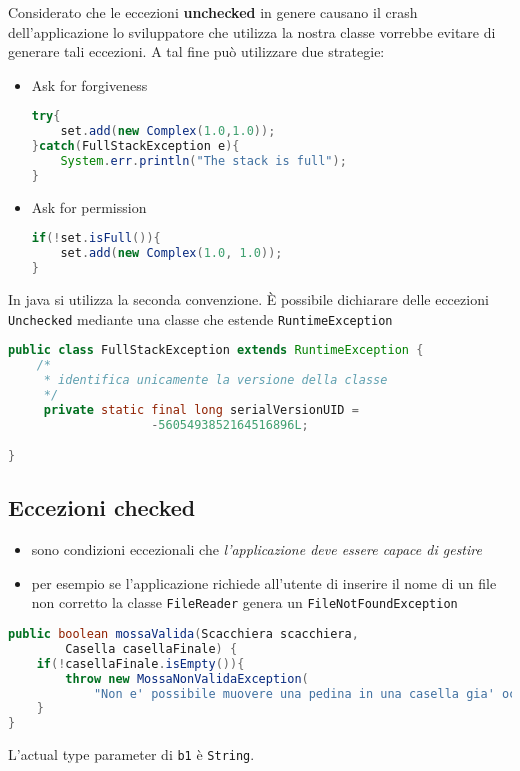 \documentclass{article}
\begin{document}
Considerato che le eccezioni \textbf{unchecked} in genere causano il crash dell'applicazione lo sviluppatore che utilizza la nostra classe vorrebbe evitare di generare tali eccezioni. A tal fine pu\`o utilizzare due strategie:
\begin{itemize}
\item Ask for forgiveness
\begin{lstlisting}[language=Java]
try{
    set.add(new Complex(1.0,1.0));
}catch(FullStackException e){
    System.err.println("The stack is full");
}
\end{lstlisting}
\item Ask for permission
\begin{lstlisting}[language=Java]
if(!set.isFull()){
    set.add(new Complex(1.0, 1.0));
}
\end{lstlisting}

\end{itemize}
 In java si utilizza la seconda convenzione.
\`E possibile dichiarare delle eccezioni \texttt{Unchecked} mediante una classe che estende \texttt{RuntimeException}

\begin{lstlisting}[language=Java]
public class FullStackException extends RuntimeException {
    /*
     * identifica unicamente la versione della classe 
     */
     private static final long serialVersionUID = 
	                -5605493852164516896L;

}
\end{lstlisting}



\subsection{Eccezioni checked}
\begin{itemize}
\item sono condizioni eccezionali che \emph{l'applicazione deve essere capace di gestire} 
\item  per esempio se l'applicazione richiede all'utente di inserire il nome di un file non corretto la classe \texttt{FileReader} genera un \texttt{FileNotFoundException}
\end{itemize}

\begin{lstlisting}[language=Java]
public boolean mossaValida(Scacchiera scacchiera, 
        Casella casellaFinale) {
    if(!casellaFinale.isEmpty()){
        throw new MossaNonValidaException(
            "Non e' possibile muovere una pedina in una casella gia' occupata");
    }
}
\end{lstlisting}
L'actual type parameter di \texttt{b1} \`e \texttt{String}.
\end{document}
